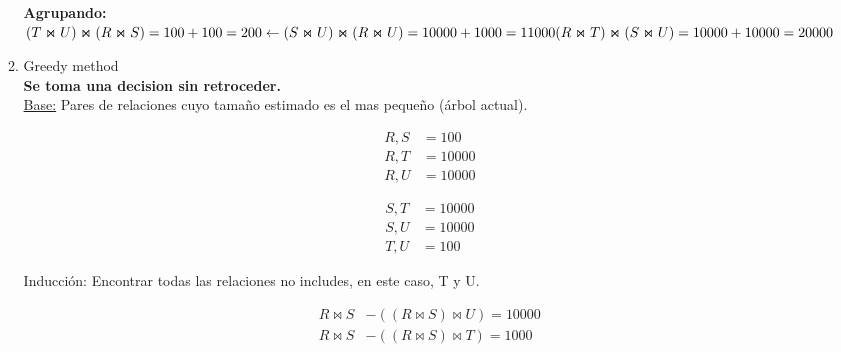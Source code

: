 \documentclass{templateNote}
\begin{document}
\begin{enumerate}
\begin{enumerate}[label=\alph*)]
                \noindent \textbf{Agrupando:} \\
                \begin{math}
                    (T \Join U) \Join (R \Join S) = 100 + 100 = 200 \leftarrow\\
                    (S \Join U) \Join (R \Join U) = 10000 + 1000 = 11000 \\
                    (R \Join T) \Join (S \Join U) = 10000 + 10000 = 20000 \\
                \end{math}

            
            \item Greedy method\\
            \noindent \textbf{Se toma una decision sin retroceder.} \\
            \noindent \underline{Base:} Pares de relaciones cuyo tamaño estimado es el mas pequeño (árbol actual).

            \noindent %
            \begin{center}
            \begin{minipage}{0.3\textwidth}
            \begin{align}
                {R,S} &= 100 \\
                {R,T} &= 10000 \nonumber \\
                {R,U} &= 10000 \nonumber 
            \end{align}
            \end{minipage}%
            \begin{minipage}{0.3\textwidth}
            \begin{align}
                {S,T} &= 10000 \nonumber \\
                {S,U} &= 10000 \nonumber \\  
                {T,U} &= 100 
            \end{align}
            \end{minipage}   
            \end{center}

            \vspace{0.5cm}
            \noindent Inducción: Encontrar todas las relaciones no includes, en este caso, T y U.

            \begin{align*}
                R \Join S &- ((R \Join S) \Join U) = 10000 \\
                R \Join S &- ((R \Join S) \Join T) = 1000 \\
            \end{align*}
            

\end{enumerate}
\end{enumerate}
\end{document}
